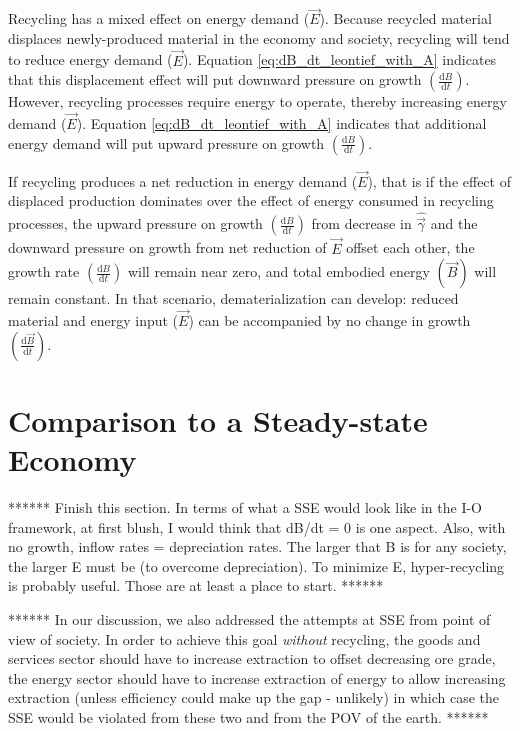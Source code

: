 Recycling has a mixed effect on energy demand ($\vec{E}$). Because recycled material displaces newly-produced material in the economy and society, recycling will tend to reduce energy demand ($\vec{E}$). Equation \ref{eq:dB_dt_leontief_with_A} indicates that this displacement effect will put downward pressure on growth $\left(\frac{\mathrm{d}B}{\mathrm{d}t}\right)$. However, recycling processes require energy to operate, thereby increasing energy demand ($\vec{E}$). Equation \ref{eq:dB_dt_leontief_with_A} indicates that additional energy demand will put upward pressure on growth $\left(\frac{\mathrm{d}B}{\mathrm{d}t}\right)$. 

If recycling produces a net reduction in energy demand ($\vec{E}$), that is if the effect of displaced production dominates over the effect of energy consumed in recycling processes, the upward pressure on growth $\left(\frac{\mathrm{d}B}{\mathrm{d}t}\right)$ from decrease in $\hat{\vec{\gamma}}$ and the downward pressure on growth from net reduction of $\vec{E}$ offset each other, the growth rate $\left(\frac{\mathrm{d}B}{\mathrm{d}t}\right)$ will remain near zero, and total embodied energy $(\vec{B})$ will remain constant. In that scenario, dematerialization can develop: reduced material and energy input ($\vec{E}$) can be accompanied by no change in growth $\left(\frac{\mathrm{d}\vec{B}}{\mathrm{d}t}\right)$.


\section{Comparison to a Steady-state Economy}



****** Finish this section. In terms of what a SSE would look like in the I-O framework, at first blush, I would think that dB/dt = 0 is one aspect.  Also, with no growth, inflow rates = depreciation rates.  The larger that B is for any society, the larger E must be (to overcome depreciation).  To minimize E, hyper-recycling is probably useful.  Those are at least a place to start. ******

****** In our discussion, we also addressed the attempts at SSE from point of view of society. In order to achieve this goal \emph{without} recycling, the goods and services sector should have to increase extraction to offset decreasing ore grade, the energy sector should have to increase extraction of energy to allow increasing extraction (unless efficiency could make up the gap - unlikely) in which case the SSE would be violated from these two and from the POV of the earth.
******


